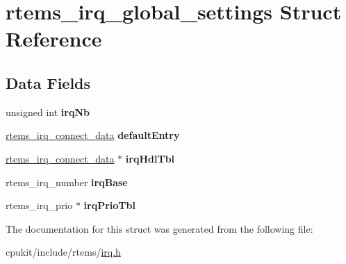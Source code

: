 \hypertarget{structrtems__irq__global__settings}{}\section{rtems\+\_\+irq\+\_\+global\+\_\+settings Struct Reference}
\label{structrtems__irq__global__settings}
\subsection*{Data Fields}
\begin{DoxyCompactItemize}
\item 
\mbox{\label{structrtems__irq__global__settings_a763327463acc63c6851529a3ddce72c8}} 
unsigned int {\bfseries irq\+Nb}
\item 
\mbox{\label{structrtems__irq__global__settings_a0b884f1a1b76272b2686e89f2d1f83c9}} 
\mbox{\hyperlink{struct____rtems__irq__connect__data____}{rtems\+\_\+irq\+\_\+connect\+\_\+data}} {\bfseries default\+Entry}
\item 
\mbox{\label{structrtems__irq__global__settings_a4d018b9a227d6e4eef9d72332054a259}} 
\mbox{\hyperlink{struct____rtems__irq__connect__data____}{rtems\+\_\+irq\+\_\+connect\+\_\+data}} $\ast$ {\bfseries irq\+Hdl\+Tbl}
\item 
\mbox{\label{structrtems__irq__global__settings_a7d44052a81ae5eb03fbe97f7cc87d501}} 
rtems\+\_\+irq\+\_\+number {\bfseries irq\+Base}
\item 
\mbox{\label{structrtems__irq__global__settings_a1244b1351e2a7abac416b7b245de624d}} 
rtems\+\_\+irq\+\_\+prio $\ast$ {\bfseries irq\+Prio\+Tbl}
\end{DoxyCompactItemize}


The documentation for this struct was generated from the following file\+:\begin{DoxyCompactItemize}
\item 
cpukit/include/rtems/\mbox{\hyperlink{cpukit_2include_2rtems_2irq_8h}{irq.\+h}}\end{DoxyCompactItemize}

